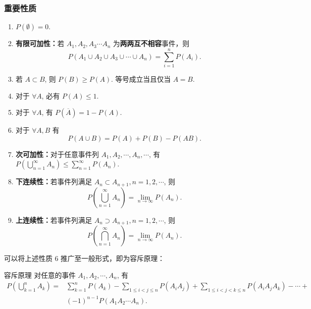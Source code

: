 \documentclass[12pt, a4paper, oneside, UTF8]{ctexbook}
\begin{document}
\subsubsection{重要性质}
\begin{enumerate}
    \item \(P\left(\emptyset\right) = 0\).
    \item \textbf{有限可加性：}若 \(A_1 , A_2 , A_3 \cdots A_n\) 为\textbf{两两互不相容}事件，则\[P\left(A_1\cup A_2 \cup A_3 \cup \cdots \cup A_n\right) = \sum_{i = 1}^{n} P\left(A_i\right).\]
    \item 若 \(A \subset B\), 则 \(P\left(B\right) \geqslant P\left(A\right)\). 等号成立当且仅当 \(A = B\).
    \item 对于 \(\forall A\), 必有 \(P\left(A\right) \leqslant 1\).
    \item 对于 \(\forall A\), 有 \(P\left(\overline{A}\right) = 1 - P\left(A\right)\).
    \item 对于 \(\forall A, B\) 有\[P\left(A\cup B\right) = P\left(A\right) + P\left(B\right) - P\left(AB\right).\]
    \item \textbf{次可加性：}对于任意事件列 \(A_1 , A_2 , \cdots , A_n , \cdots\), 有 \(P\left(\bigcup_{n = 1}^{\infty} A_n\right) \leqslant \sum_{n = 1}^{\infty} P\left(A_n\right)\).
    \item \textbf{下连续性：}若事件列满足 \(A_n \subset A_{n+1} , n = 1 , 2 , \cdots\), 则\[P\left(\bigcup_{n = 1}^{\infty} A_n\right) = \lim_{n \rightarrow \infty} P\left(A_n\right).\]
    \item \textbf{上连续性：}若事件列满足 \(A_n \supset A_{n+1} , n = 1 , 2 , \cdots\), 则\[P\left(\bigcap_{n = 1}^{\infty} A_n\right) = \lim_{n \rightarrow \infty} P\left(A_n\right).\]
\end{enumerate}

可以将上述性质 \(6\) 推广至一般形式，即为容斥原理：

\begin{thm}{容斥原理}
    对任意的事件 \(A_1 , A_2 , \cdots , A_n\), 有
    \begin{align*}
        P\left(\bigcup^{n}_{k = 1} A_k\right) = &\sum_{k = 1}^{n}P\left(A_k\right) - \sum_{1 \leqslant i < j \leqslant n} P\left(A_i A_j\right) + \sum_{1 \leqslant i < j < k \leqslant n} P\left(A_i A_j A_k\right) - \cdots + \\ &\left(-1\right)^{n-1}P\left(A_1 A_2 \cdots A_n\right).
    \end{align*}
\end{thm}
\end{document}
